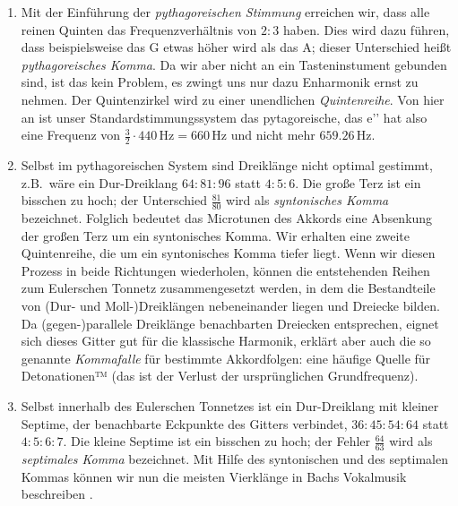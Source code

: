 \documentclass[ngerman,11pt]{scrartcl}
\begin{document}
\begin{enumerate}
\item Mit der Einführung der \emph{pythagoreischen Stimmung} erreichen wir,
  dass alle reinen Quinten das Frequenzverhältnis von $2:3$ haben. Dies wird
  dazu führen, dass beispielsweise das \sharp G etwas höher wird als das
  \flat A; dieser Unterschied heißt \emph{pythagoreisches Komma}. Da wir aber 
  nicht an ein Tasteninstument 
  gebunden sind, ist das kein Problem, es zwingt uns nur dazu Enharmonik ernst
  zu nehmen. Der Quintenzirkel wird zu einer unendlichen \emph{Quintenreihe}.
  Von hier an ist unser Standardstimmungssystem das pytagoreische, das e’’ hat
  also eine Frequenz von $\frac32\cdot 440\,\text{Hz}=660\,\text{Hz}$ und nicht
  mehr $659.26\,\text{Hz}$.
\item Selbst im pythagoreischen System sind Dreiklänge nicht optimal gestimmt,
  z.B.\ wäre ein Dur-Dreiklang $64:81:96$ statt $4:5:6$. Die große Terz ist ein
  bisschen zu hoch; der Unterschied $\frac{81}{80}$ wird als \emph{syntonisches
  Komma} bezeichnet. Folglich bedeutet das Microtunen des Akkords eine
  Absenkung der großen Terz um ein syntonisches Komma. Wir erhalten eine zweite
  Quintenreihe, die um ein syntonisches Komma tiefer liegt. Wenn wir diesen
  Prozess in beide Richtungen wiederholen, können die entstehenden Reihen zum
  Eulerschen Tonnetz zusammengesetzt werden, in dem die Bestandteile von (Dur-
  und Moll-)Dreiklängen nebeneinander liegen und Dreiecke bilden. Da
  (gegen-)parallele Dreiklänge benachbarten Dreiecken entsprechen, eignet sich
  dieses Gitter gut für die klassische Harmonik, erklärt aber auch die so
  genannte \emph{Kommafalle} für bestimmte Akkordfolgen: eine häufige Quelle
  für Detonationen™ (das ist der Verlust der ursprünglichen Grundfrequenz).
\item {} Selbst innerhalb des 
  Eulerschen Tonnetzes ist ein Dur-Dreiklang mit kleiner Septime, der
  benachbarte Eckpunkte des Gitters verbindet, $36:45:54:64$ statt $4:5:6:7$.
  Die kleine Septime ist ein bisschen zu hoch; der Fehler $\frac{64}{63}$ wird
  als \emph{septimales Komma} bezeichnet. Mit Hilfe des syntonischen und des
  septimalen Kommas können wir nun die meisten Vierklänge in Bachs Vokalmusik
  beschreiben .
\end{enumerate}
\end{document}
